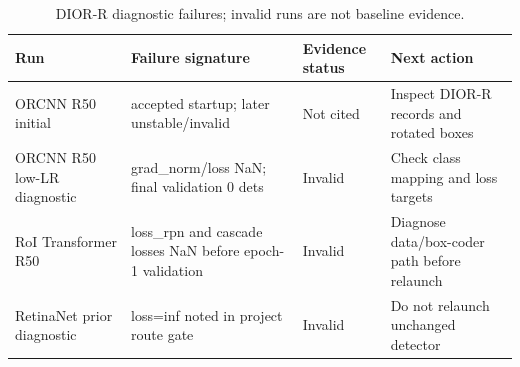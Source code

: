 \begin{table}[t]
\centering
\caption{DIOR-R diagnostic failures; invalid runs are not baseline evidence.}
\label{tab:dior\_r\_diagnostics}
\begin{tabular}{llll}
\toprule
Run & Failure signature & Evidence status & Next action \\
\midrule
ORCNN R50 initial & accepted startup; later unstable/invalid & Not cited & Inspect DIOR-R records and rotated boxes \\
ORCNN R50 low-LR diagnostic & grad\_norm/loss NaN; final validation 0 dets & Invalid & Check class mapping and loss targets \\
RoI Transformer R50 & loss\_rpn and cascade losses NaN before epoch-1 validation & Invalid & Diagnose data/box-coder path before relaunch \\
RetinaNet prior diagnostic & loss=inf noted in project route gate & Invalid & Do not relaunch unchanged detector \\
\bottomrule
\end{tabular}
\end{table}
